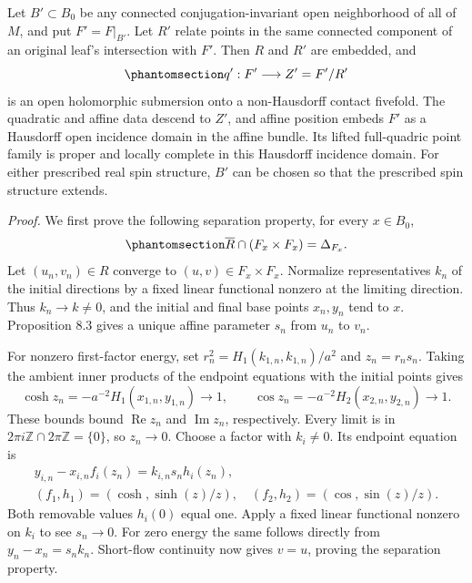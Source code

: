 \documentclass[
  english,
  11pt,
  reqno]{amsart}
\begin{document}
Let \(B'\subset B_0\) be any connected conjugation-invariant open
neighborhood of all of \(M\), and put \(F'=F|_{B'}\). Let \(R'\) relate
points in the same connected component of an original leaf's
intersection with \(F'\). Then \(R\) and \(R'\) are embedded, and
\begin{equation}\protect\phantomsection\label{eq:nariai-restricted-point-quotient}{
q':F'\longrightarrow Z'=F'/R'
}\end{equation} is an open holomorphic submersion onto a non-Hausdorff
contact fivefold. The quadratic and affine data descend to \(Z'\), and
affine position embeds \(F'\) as a Hausdorff open incidence domain in
the affine bundle. Its lifted full-quadric point family is proper and
locally complete in this Hausdorff incidence domain. For either
prescribed real spin structure, \(B'\) can be chosen so that the
prescribed spin structure extends.

\emph{Proof.} We first prove the following separation property, for
every \(x\in B_0\),
\begin{equation}\protect\phantomsection\label{eq:nariai-same-point-relation-closure}{
\overline R\cap(F_x\times F_x)=\Delta_{F_x}.
}\end{equation} Let \((u_n,v_n)\in R\) converge to
\((u,v)\in F_x\times F_x\). Normalize representatives \(k_n\) of the
initial directions by a fixed linear functional nonzero at the limiting
direction. Thus \(k_n\to k\ne0\), and the initial and final base points
\(x_n,y_n\) tend to \(x\). Proposition 8.3 gives a unique affine
parameter \(s_n\) from \(u_n\) to \(v_n\).

For nonzero first-factor energy, set \(r_n^2=H_1(k_{1,n},k_{1,n})/a^2\)
and \(z_n=r_ns_n\). Taking the ambient inner products of the endpoint
equations with the initial points gives \[
\cosh z_n=-a^{-2}H_1(x_{1,n},y_{1,n})\longrightarrow1,
\qquad
\cos z_n=-a^{-2}H_2(x_{2,n},y_{2,n})\longrightarrow1.
\] These bounds bound \(\operatorname{Re}z_n\) and
\(\operatorname{Im}z_n\), respectively. Every limit is in
\(2\pi i\mathbb Z\cap2\pi\mathbb Z=\{0\}\), so \(z_n\to0\). Choose a
factor with \(k_i\ne0\). Its endpoint equation is \[
\begin{gathered}
y_{i,n}-x_{i,n}f_i(z_n)=k_{i,n}s_nh_i(z_n), \\
(f_1,h_1)=(\cosh,\sinh(z)/z),\quad
(f_2,h_2)=(\cos,\sin(z)/z).
\end{gathered}
\] Both removable values \(h_i(0)\) equal one. Apply a fixed linear
functional nonzero on \(k_i\) to see \(s_n\to0\). For zero energy the
same follows directly from \(y_n-x_n=s_nk_n\). Short-flow continuity now
gives \(v=u\), proving the separation property.
\end{document}
